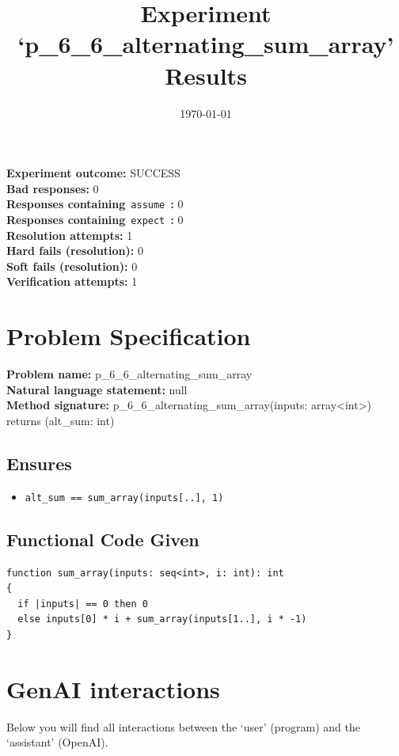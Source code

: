 \documentclass{article}
\begin{document}
\title{Experiment `p\_6\_6\_alternating\_sum\_array' Results}
\author{\today}
\date{}
\maketitle
\textbf{Experiment outcome: }SUCCESS
\\\textbf{Bad responses: }0
\\\textbf{Responses containing}~\texttt{assume}~\textbf{: }0
\\\textbf{Responses containing}~\texttt{expect}~\textbf{: }0
\\\textbf{Resolution attempts: }1
\\\textbf{Hard fails (resolution): }0
\\\textbf{Soft fails (resolution): }0
\\\textbf{Verification attempts: }1
\section*{Problem Specification}
\textbf{Problem name: }p\_6\_6\_alternating\_sum\_array
\\\textbf{Natural language statement: }null
\\\textbf{Method signature: }p\_6\_6\_alternating\_sum\_array(inputs: array<int>) returns (alt\_sum: int)
\subsection*{Ensures}
\begin{itemize}
\item \texttt{alt\_sum == sum\_array(inputs[..], 1)}
\end{itemize}
\subsection*{Functional Code Given}
\begin{lstlisting}
function sum_array(inputs: seq<int>, i: int): int
{
  if |inputs| == 0 then 0
  else inputs[0] * i + sum_array(inputs[1..], i * -1)
}
\end{lstlisting}
\clearpage
\section*{GenAI interactions}
Below you will find all interactions between the `user' (program) and the `assistant' (OpenAI).
\end{document}

